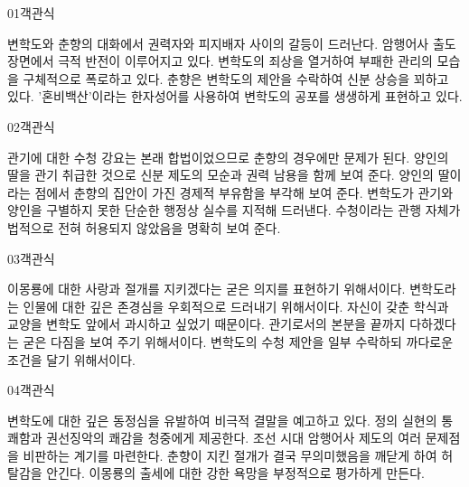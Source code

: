 \documentclass[fs85,seriesWit]{korfarm-base}
\begin{document}
\kfBeginMC
\begin{kfQBlock}{01}{객관식}
\begin{kfChoices}
\kfChoice 변학도와 춘향의 대화에서 권력자와 피지배자 사이의 갈등이 드러난다.
\kfChoice 암행어사 출도 장면에서 극적 반전이 이루어지고 있다.
\kfChoice 변학도의 죄상을 열거하여 부패한 관리의 모습을 구체적으로 폭로하고 있다.
\kfChoice 춘향은 변학도의 제안을 수락하여 신분 상승을 꾀하고 있다.
\kfChoice '혼비백산'이라는 한자성어를 사용하여 변학도의 공포를 생생하게 표현하고 있다.
\end{kfChoices}
\end{kfQBlock}

\begin{kfQBlock}{02}{객관식}
\begin{kfChoices}
\kfChoice 관기에 대한 수청 강요는 본래 합법이었으므로 춘향의 경우에만 문제가 된다.
\kfChoice 양인의 딸을 관기 취급한 것으로 신분 제도의 모순과 권력 남용을 함께 보여 준다.
\kfChoice 양인의 딸이라는 점에서 춘향의 집안이 가진 경제적 부유함을 부각해 보여 준다.
\kfChoice 변학도가 관기와 양인을 구별하지 못한 단순한 행정상 실수를 지적해 드러낸다.
\kfChoice 수청이라는 관행 자체가 법적으로 전혀 허용되지 않았음을 명확히 보여 준다.
\end{kfChoices}
\end{kfQBlock}

\begin{kfQBlock}{03}{객관식}
\begin{kfChoices}
\kfChoice 이몽룡에 대한 사랑과 절개를 지키겠다는 굳은 의지를 표현하기 위해서이다.
\kfChoice 변학도라는 인물에 대한 깊은 존경심을 우회적으로 드러내기 위해서이다.
\kfChoice 자신이 갖춘 학식과 교양을 변학도 앞에서 과시하고 싶었기 때문이다.
\kfChoice 관기로서의 본분을 끝까지 다하겠다는 굳은 다짐을 보여 주기 위해서이다.
\kfChoice 변학도의 수청 제안을 일부 수락하되 까다로운 조건을 달기 위해서이다.
\end{kfChoices}
\end{kfQBlock}

\begin{kfQBlock}{04}{객관식}
\begin{kfChoices}
\kfChoice 변학도에 대한 깊은 동정심을 유발하여 비극적 결말을 예고하고 있다.
\kfChoice 정의 실현의 통쾌함과 권선징악의 쾌감을 청중에게 제공한다.
\kfChoice 조선 시대 암행어사 제도의 여러 문제점을 비판하는 계기를 마련한다.
\kfChoice 춘향이 지킨 절개가 결국 무의미했음을 깨닫게 하여 허탈감을 안긴다.
\kfChoice 이몽룡의 출세에 대한 강한 욕망을 부정적으로 평가하게 만든다.
\end{kfChoices}
\end{kfQBlock}
\end{document}
